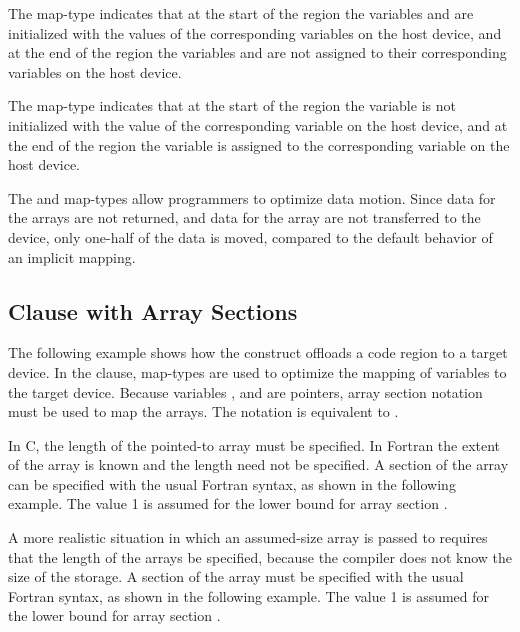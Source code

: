 The  map-type indicates that at the start of the  region 
the variables  and  are initialized with the values of the corresponding variables 
on the host device, and at the end of the  region the variables 
 and  are not assigned to their corresponding variables on the host device.

The  map-type indicates that at the start of the  region 
the variable  is not initialized with the value of the corresponding variable 
on the host device, and at the end of the  region the variable  
is assigned to the corresponding variable on the host device.


The  and  map-types allow programmers to optimize data 
motion. Since data for the  arrays are not returned, and data for the  array 
are not transferred to the device, only one-half of the data is moved, compared 
to the default behavior of an implicit mapping.


\subsection{ Clause with Array Sections}
\label{subsec:target_array_section}

The following example shows how the  construct offloads a code region 
to a target device. In the  clause, map-types are used to optimize 
the mapping of variables to the target device. Because variables ,  and  are 
pointers, array section notation must be used to map the arrays. The notation  
is equivalent to .

\clearpage

In C, the length of the pointed-to array must be specified. In Fortran the extent 
of the array is known and the length need not be specified. A section of the array 
can be specified with the usual Fortran syntax, as shown in the following example. 
The value 1 is assumed for the lower bound for array section .


A more realistic situation in which an assumed-size array is passed to  
requires that the length of the arrays be specified, because the compiler does 
not know the size of the storage. A section of the array must be specified with 
the usual Fortran syntax, as shown in the following example. The value 1 is assumed 
for the lower bound for array section .

